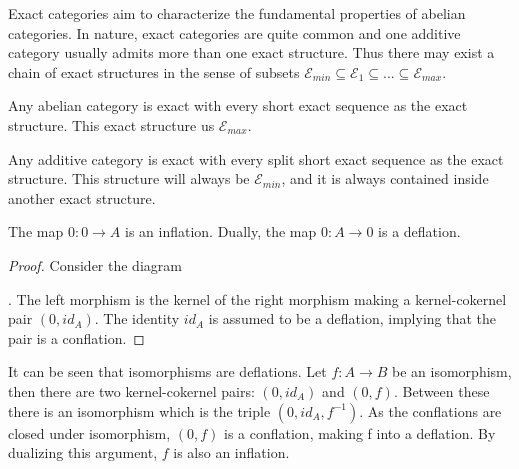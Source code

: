     Exact categories aim to characterize the fundamental properties of abelian categories. In nature, exact categories are quite common and one additive category usually admits more than one exact structure. Thus there may exist a chain of exact structures in the sense of subsets $\mathcal{E}_{min} \subseteq \mathcal{E}_1 \subseteq ... \subseteq \mathcal{E}_{max}$. 

    \begin{example}
        Any abelian category is exact with every short exact sequence as the exact structure. This exact structure us $\mathcal{E}_{max}$.
    \end{example}

    \begin{example}
        Any additive category is exact with every split short exact sequence as the exact structure. This structure will always be $\mathcal{E}_{min}$, and it is always contained inside another exact structure.
    \end{example}

    \begin{lemma}
        The map $0:0\rightarrow A$ is an inflation. Dually, the map $0:A\rightarrow 0$ is a deflation.
    \end{lemma}

    \begin{proof}
        Consider the diagram . The left morphism is the kernel of the right morphism making a kernel-cokernel pair $(0,id_A)$. The identity $id_A$ is assumed to be a deflation, implying that the pair is a conflation.
    \end{proof}

    \begin{remark}
        It can be seen that isomorphisms are deflations. Let $f:A\rightarrow B$ be an isomorphism, then there are two kernel-cokernel pairs: $(0,id_A)$ and $(0,f)$. Between these there is an isomorphism which is the triple $(0,id_A,f^{-1})$. As the conflations are closed under isomorphism, $(0,f)$ is a conflation, making f into a deflation. By dualizing this argument, $f$ is also an inflation.
        \begin{center}
        \end{center}
    \end{remark}

